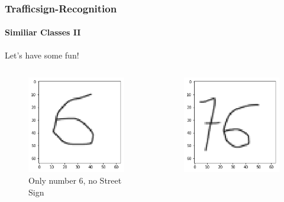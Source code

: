 \begin{frame}
\frametitle{Trafficsign-Recognition}
\framesubtitle{Similiar Classes II}
\begin{center}	
	Let's have some fun!
\end{center}
\begin{columns}
	\begin{column}{0.33\textwidth}
		\begin{center}
			\begin{figure}
				\includegraphics[width=0.9\linewidth]{Images/6Image}
				\caption[6]{Only number 6, no Street Sign}
				\label{fig:6}
			\end{figure}
		\end{center}		
	\end{column}
	\begin{column}{0.33\textwidth}
		\begin{center}
			\begin{figure}
				\includegraphics[width=0.9\linewidth]{Images/76Image}

\end{figure}
\end{center}
\end{column}
\end{columns}
\end{frame}
